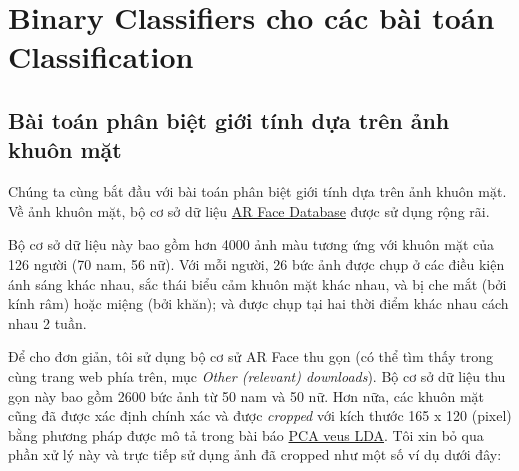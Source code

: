\chapter{Binary Classifiers cho các bài toán Classification}
 
 
\section{Bài toán phân biệt giới tính dựa trên ảnh khuôn mặt }
Chúng ta cùng bắt đầu với bài toán phân biệt giới tính dựa trên ảnh khuôn mặt. Về ảnh khuôn mặt, bộ cơ sở dữ liệu \href{http://www2.ece.ohio-state.edu/~aleix/ARdatabase.html}{AR Face Database} được sử dụng rộng rãi.  
 
Bộ cơ sở dữ liệu này bao gồm hơn 4000 ảnh màu tương ứng với khuôn mặt của 126 người (70 nam, 56 nữ). Với mỗi người, 26 bức ảnh được chụp ở các điều kiện ánh sáng khác nhau, sắc thái biểu cảm khuôn mặt khác nhau, và bị che mắt (bởi kính râm) hoặc miệng (bởi khăn); và được chụp tại hai thời điểm khác nhau cách nhau 2 tuần.  
 
Để cho đơn giản, tôi sử dụng bộ cơ sử AR Face thu gọn (có thể tìm thấy trong cùng trang web phía trên, mục \textit{Other (relevant) downloads}). Bộ cơ sở dữ liệu thu gọn này bao gồm 2600 bức ảnh từ 50 nam và 50 nữ. Hơn nữa, các khuôn mặt cũng đã được xác định chính xác và được \textit{cropped} với kích thước 165 x 120 (pixel) bằng phương pháp được mô tả trong bài báo \href{http://lectures.molgen.mpg.de/networkanalysis13/PCAversusLDA_eigenfaces.pdf}{PCA veus LDA}. Tôi xin bỏ qua phần xử lý này và trực tiếp sử dụng ảnh đã cropped như một số ví dụ dưới đây: 
 
